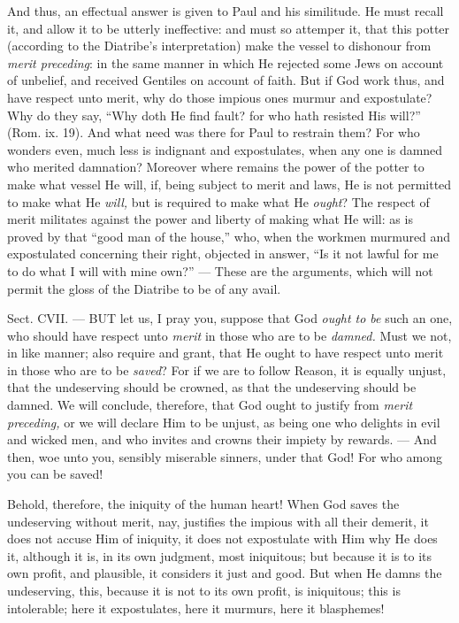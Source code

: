 And thus, an effectual answer is given to Paul and his similitude. He must recall it, and allow it to be utterly ineffective: and must so attemper it, that this potter (according to the Diatribe’s interpretation) make the vessel to dishonour from \emph{merit preceding}: in the same manner in which He rejected some Jews on account of unbelief, and received Gentiles on account of faith. But if God work thus, and have respect unto merit, why do those impious ones murmur and expostulate? Why do they say, “Why doth He find fault? for who hath resisted His will?” (Rom. ix. 19). And what need was there for Paul to restrain them? For who wonders even, much less is indignant and expostulates, when any one is damned who merited damnation? Moreover where remains the power of the potter to make what vessel He will, if, being subject to merit and laws, He is not permitted to make what He \emph{will, }but is required to make what He \emph{ought}? The respect of merit militates against the power and liberty of making what He will: as is proved by that “good man of the house,” who, when the workmen murmured and expostulated concerning their right, objected in answer, “Is it not lawful for me to do what I will with mine own?” — These are the arguments, which will not permit the gloss of the Diatribe to be of any avail.


Sect. CVII. — BUT let us, I pray you, suppose that God \emph{ought to be }such an one, who should have respect unto \emph{merit }in those who are to be \emph{damned. }Must we not, in like manner; also require and grant, that He ought to have respect unto merit in those who are to be \emph{saved}? For if we are to follow Reason, it is equally unjust, that the undeserving should be crowned, as that the undeserving should be damned. We will conclude, therefore, that God ought to justify from \emph{merit preceding, }or we will declare Him to be unjust, as being one who delights in evil and wicked men, and who invites and crowns their impiety by rewards. — And then, woe unto you, sensibly miserable sinners, under that God! For who among you can be saved!

Behold, therefore, the iniquity of the human heart! When God saves the undeserving without merit, nay, justifies the impious with all their demerit, it does not accuse Him of iniquity, it does not expostulate with Him why He does it, although it is, in its own judgment, most iniquitous; but because it is to its own profit, and plausible, it considers it just and good. But when He damns the undeserving, this, because it is not to its own profit, is iniquitous; this is intolerable; here it expostulates, here it murmurs, here it blasphemes!

